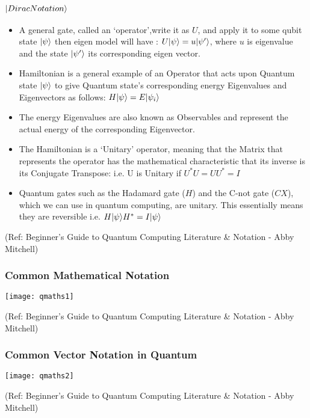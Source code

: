  \begin{frame}[fragile]\frametitle{$|{Dirac Notation}\rangle $}
\begin{itemize}
\item A general gate, called an ‘operator’,write it as $U$, and apply it to
some qubit state $|{\psi}\rangle$ then eigen model will have : $U |{\psi}\rangle = u |{\psi'}\rangle$, where $u$ is eigenvalue and the state $|{\psi'}\rangle$ its corresponding eigen vector.

\item Hamiltonian is a general example of an
Operator that acts upon Quantum state $|{\psi}\rangle$  to give  Quantum state’s
corresponding energy Eigenvalues and Eigenvectors as follows: $H |{\psi}\rangle = E |{\psi_i}\rangle$ 
\item The
energy Eigenvalues are also known as Observables and represent the actual
energy of the corresponding Eigenvector.

\item The Hamiltonian is a ‘Unitary’ operator, meaning that the Matrix that
represents the operator has the mathematical characteristic that its inverse
is its Conjugate Transpose: i.e. U is Unitary if $U^*U = UU^* = I$

\item  Quantum gates such as the Hadamard gate ($H$) and the C-not gate ($CX$), which we can use in quantum computing, are unitary. This
essentially means they are reversible i.e. $H |{\psi}\rangle H^* = I |{\psi}\rangle $
\end{itemize}




\tiny{(Ref: Beginner’s Guide to Quantum Computing Literature \& Notation - Abby Mitchell)}

\end{frame}

 \begin{frame}[fragile]\frametitle{Common Mathematical Notation}

\begin{center}
\texttt{[image: qmaths1]}
\end{center}

\tiny{(Ref: Beginner’s Guide to Quantum Computing Literature \& Notation - Abby Mitchell)}

\end{frame}

 \begin{frame}[fragile]\frametitle{Common Vector Notation in Quantum}

\begin{center}
\texttt{[image: qmaths2]}
\end{center}

\tiny{(Ref: Beginner’s Guide to Quantum Computing Literature \& Notation - Abby Mitchell)}

\end{frame}

